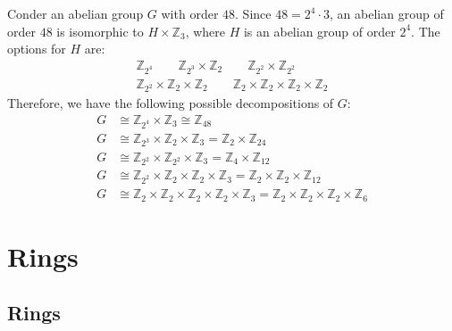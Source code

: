 \begin{eg}
  Conder an abelian group $G$ with order $48$. Since $48 = 2^4 \cdot 3$, an abelian group of order $48$ is isomorphic to $H \times \mathbb{Z}_3$, where $H$ is an abelian group of order $2^4$. The options for $H$ are:
  \begin{gather*}
    \mathbb{Z}_{2^4} \qquad \mathbb{Z}_{2^3} \times \mathbb{Z}_2 \qquad \mathbb{Z}_{2^2} \times \mathbb{Z}_{2^2} \\
    \mathbb{Z}_{2^2} \times \mathbb{Z}_2 \times \mathbb{Z}_2 \qquad \mathbb{Z}_2 \times \mathbb{Z}_2 \times \mathbb{Z}_2 \times \mathbb{Z}_2
  \end{gather*}
  Therefore, we have the following possible decompositions of $G$:
  \begin{align*}
    G &\cong \mathbb{Z}_{2^4} \times \mathbb{Z}_3 \cong \mathbb{Z}_{48} \\
    G &\cong \mathbb{Z}_{2^3} \times \mathbb{Z}_2 \times \mathbb{Z}_3 = \mathbb{Z}_2 \times \mathbb{Z}_{24} \\ 
    G &\cong \mathbb{Z}_{2^2} \times \mathbb{Z}_{2^2} \times \mathbb{Z}_3 = \mathbb{Z}_4 \times \mathbb{Z}_{12} \\ 
    G &\cong \mathbb{Z}_{2^2} \times \mathbb{Z}_2 \times \mathbb{Z}_2 \times \mathbb{Z}_3 = \mathbb{Z}_2 \times \mathbb{Z}_2 \times \mathbb{Z}_{12} \\ 
    G &\cong \mathbb{Z}_2 \times \mathbb{Z}_2 \times \mathbb{Z}_2 \times \mathbb{Z}_2 \times \mathbb{Z}_3 = \mathbb{Z}_2 \times \mathbb{Z}_2 \times \mathbb{Z}_2 \times \mathbb{Z}_6
  \end{align*}
\end{eg}



\section{Rings}%
\label{sec:rings}

\subsection{Rings}%
\label{sub:rings}

